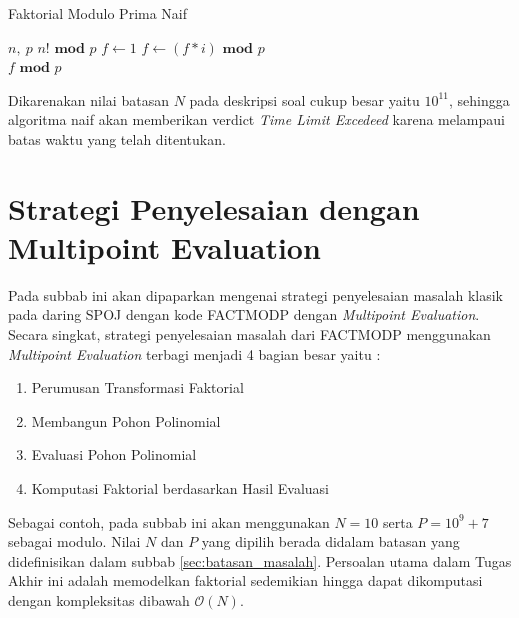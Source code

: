 \begin{algorithm}
	\caption{Faktorial Modulo Prima Naif}
	\label{psdo:factorial_naif}
	\begin{algorithmic}[1]
		\Require $n,\ p$
		\Ensure $n! \textbf{ mod } p$
		\State $f \leftarrow 1$
			\State $ f \leftarrow ( f * i ) \textbf{ mod } p$
		\EndFor \\
		\Return $ f \textbf{ mod } p $
	\end{algorithmic}
\end{algorithm}

Dikarenakan nilai batasan $ N $ pada deskripsi soal cukup besar yaitu $ 10^{11} $, sehingga algoritma naif akan memberikan verdict \textit{Time Limit Excedeed} karena melampaui batas waktu yang telah ditentukan.

\section{ Strategi Penyelesaian dengan Multipoint Evaluation}
\label{sec:penyelesaian_multipoint_evaluation}
Pada subbab ini akan dipaparkan mengenai strategi penyelesaian masalah klasik pada daring SPOJ dengan kode FACTMODP dengan \textit{Multipoint Evaluation}. Secara singkat, strategi penyelesaian masalah dari FACTMODP menggunakan \textit{Multipoint Evaluation} terbagi menjadi 4 bagian besar yaitu :
\begin{enumerate}
	\item Perumusan Transformasi Faktorial
	\item Membangun Pohon Polinomial
	\item Evaluasi Pohon Polinomial
	\item Komputasi Faktorial berdasarkan Hasil Evaluasi
\end{enumerate}

Sebagai contoh, pada subbab ini akan menggunakan $ N = 10 $ serta $ P = 10^9 + 7 $ sebagai modulo. Nilai $ N $ dan $ P $ yang dipilih berada didalam batasan yang didefinisikan dalam subbab \ref{sec:batasan_masalah}. Persoalan utama dalam Tugas Akhir ini adalah memodelkan faktorial sedemikian hingga dapat dikomputasi dengan kompleksitas dibawah $ \mathcal{O}{(N)} $.

